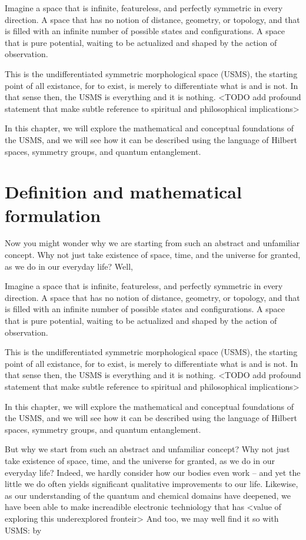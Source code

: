 Imagine a space that is infinite, featureless, and perfectly symmetric in every direction. A space that has no notion of distance, geometry, or topology, and that is filled with an infinite number of possible states and configurations. A space that is pure potential, waiting to be actualized and shaped by the action of observation.

This is the undifferentiated symmetric morphological space (USMS), the starting point of all existance, for to exist, is merely to differentiate what is and is not. In that sense then, the USMS is everything and it is nothing. <TODO add profound statement that make subtle reference to spiritual and philosophical implications>

In this chapter, we will explore the mathematical and conceptual foundations of the USMS, and we will see how it can be described using the language of Hilbert spaces, symmetry groups, and quantum entanglement.

\section{Definition and mathematical formulation}

Now you might wonder why we are starting from such an abstract and unfamiliar concept. Why not just take existence of space, time, and the universe for granted, as we do in our everyday life? Well,


Imagine a space that is infinite, featureless, and perfectly symmetric in every direction. A space that has no notion of distance, geometry, or topology, and that is filled with an infinite number of possible states and configurations. A space that is pure potential, waiting to be actualized and shaped by the action of observation.

This is the undifferentiated symmetric morphological space (USMS), the starting point of all existance, for to exist, is merely to differentiate what is and is not. In that sense then, the USMS is everything and it is nothing. <TODO add profound statement that make subtle reference to spiritual and philosophical implications>

In this chapter, we will explore the mathematical and conceptual foundations of the USMS, and we will see how it can be described using the language of Hilbert spaces, symmetry groups, and quantum entanglement.

But why we start from such an abstract and unfamiliar concept? Why not just take existence of space, time, and the universe for granted, as we do in our everyday life? Indeed, we hardly consider how our bodies even work -- and yet the little we do often yields significant qualitative improvements to our life. Likewise, as our understanding of the quantum and chemical domains have deepened, we have been able to make increadible electronic techniology that has <value of exploring this underexplored fronteir> And too, we may well find it so with USMS: by 

